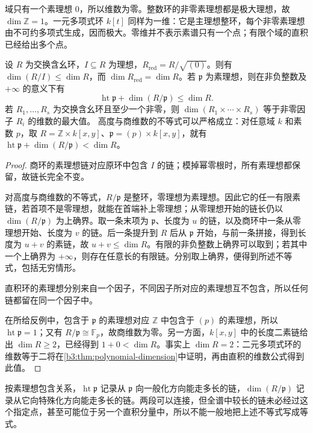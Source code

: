 \ProseParagraphBreak
域只有一个素理想 \(0\)，所以维数为零。整数环的非零素理想都是极大理想，故 \(\dim\mathbb Z=1\)。一元多项式环 \(k[t]\) 同样为一维：它是主理想整环，每个非零素理想由不可约多项式生成，因而极大。零维并不表示素谱只有一个点；有限个域的直积已经给出多个点。

\begin{proposition}\label{b3:prop:dimension-basic-comparison}
	设 \(R\) 为交换含幺环，\(I\subseteq R\) 为理想，\(R_{\mathrm{red}}=R/\sqrt{(0)}\)。则有 \(\dim(R/I)\le\dim R\)，而 \(\dim R_{\mathrm{red}}=\dim R\)。若 \(\mathfrak p\) 为素理想，则在非负整数及 \(+\infty\) 的意义下有
	\[
		\operatorname{ht}\mathfrak p+\dim(R/\mathfrak p)\le\dim R.
	\]
	若 \(R_1,\ldots,R_s\) 为交换含幺环且至少一个非零，则 \(\dim(R_1\times\cdots\times R_s)\) 等于非零因子 \(R_i\) 的维数的最大值。 高度与商维数的不等式可以严格成立：对任意域 \(k\) 和素数 \(p\)，取 \(R=\mathbb Z\times k[x,y]\)、\(\mathfrak p=(p)\times k[x,y]\)，就有 \(\operatorname{ht}\mathfrak p+\dim(R/\mathfrak p)<\dim R\)。
\end{proposition}
\begin{proof}
	商环的素理想链对应原环中包含 \(I\) 的链；模掉幂零根时，所有素理想都保留，故链长完全不变。

	对高度与商维数的不等式，\(R/\mathfrak p\) 是整环，零理想为素理想。因此它的任一有限素链，若首项不是零理想，就能在首端补上零理想；从零理想开始的链长仍以 \(\dim(R/\mathfrak p)\) 为上确界。取一条末项为 \(\mathfrak p\)、长度为 \(u\) 的链，以及商环中一条从零理想开始、长度为 \(v\) 的链。后一条提升到 \(R\) 后从 \(\mathfrak p\) 开始，与前一条拼接，得到长度为 \(u+v\) 的素链，故 \(u+v\le\dim R\)。有限的非负整数上确界可以取到；若其中一个上确界为 \(+\infty\)，则存在任意长的有限链。分别取上确界，便得到所述不等式，包括无穷情形。

	直积环的素理想分别来自一个因子，不同因子所对应的素理想互不包含，所以任何链都留在同一个因子中。

	在所给反例中，包含于 \(\mathfrak p\) 的素理想对应 \(\mathbb Z\) 中包含于 \((p)\) 的素理想，所以 \(\operatorname{ht}\mathfrak p=1\)；又有 \(R/\mathfrak p\cong\mathbb F_p\)，故商维数为零。另一方面，\(k[x,y]\) 中的长度二素链给出 \(\dim R\ge2\)，已经得到 \(1+0<\dim R\)。事实上 \(\dim R=2\)：二元多项式环的维数等于二将在\cref{b3:thm:polynomial-dimension}中证明，再由直积的维数公式得到此值。
\end{proof}

按素理想包含关系，\(\operatorname{ht}\mathfrak p\) 记录从 \(\mathfrak p\) 向一般化方向能走多长的链，\(\dim(R/\mathfrak p)\) 记录从它向特殊化方向能走多长的链。两段可以连接，但全谱中较长的链未必经过这个指定点，甚至可能位于另一个直积分量中，所以不能一般地把上述不等式写成等式。

